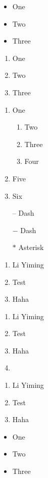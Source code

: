 \documentclass{article}
\begin{document}
\begin{itemize}
	\item One
	\item Two
	\item Three
\end{itemize}

\begin{enumerate}
	\item One
	\item Two
	\item Three
\end{enumerate}

\begin{enumerate}
	\item One
    \begin{enumerate}
    	\item Two
        \item Three
        \item Four
    \end{enumerate}
    \item Five
    \item Six
\end{enumerate}

\begin{itemize}
	\item[--] Dash
  \item[$-$] Dash
  \item[$\ast$] Asterisk
\end{itemize}


\begin{enumerate}[label=(\roman*)]
\item Li Yiming
\item Test
\item Haha
\end{enumerate}

\begin{enumerate}[label=\arabic*)]
\item Li Yiming
\item Test
\item Haha
\item \end{enumerate}

\begin{enumerate}[label=\alph*)]
\item Li Yiming
\item Test
\item Haha
\end{enumerate}

\begin{itemize}[label=$\ast$]
	\item One
  \item Two
  \item Three
\end{itemize}
\end{document}
